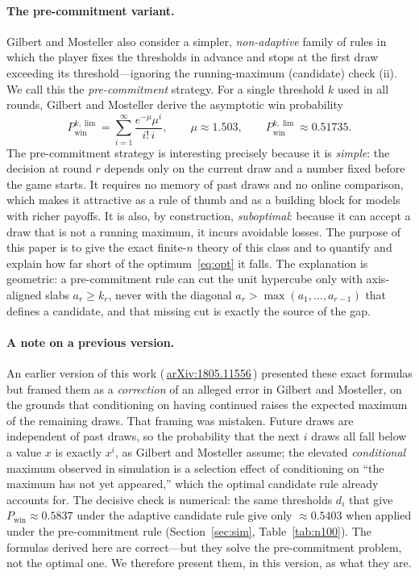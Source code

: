 \documentclass[11pt]{article}
\newcommand{\amax}{\operatorname{max}}
\begin{document}
\paragraph{The pre-commitment variant.}
Gilbert and Mosteller also consider a simpler, \emph{non-adaptive} family of rules in
which the player fixes the thresholds in advance and stops at the first draw exceeding
its threshold---ignoring the running-maximum (candidate) check (ii). We call this the
\emph{pre-commitment} strategy. For a single threshold $k$ used in all rounds, Gilbert
and Mosteller derive the asymptotic win probability
\begin{equation}\label{eq:pcsingle}
  P_{\text{win}}^{k,\lim}=\sum_{i=1}^{\infty}\frac{e^{-\mu}\mu^{i}}{i!\,i},
  \qquad \mu\approx 1.503,\qquad P_{\text{win}}^{k,\lim}\approx 0.51735 .
\end{equation}
The pre-commitment strategy is interesting precisely because it is \emph{simple}: the
decision at round $r$ depends only on the current draw and a number fixed before the
game starts. It requires no memory of past draws and no online comparison, which makes
it attractive as a rule of thumb and as a building block for models with richer
payoffs. It is also, by construction, \emph{suboptimal}: because it can accept a draw
that is not a running maximum, it incurs avoidable losses. The purpose of this paper is
to give the exact finite-$n$ theory of this class and to quantify and explain how far
short of the optimum~\eqref{eq:opt} it falls. The explanation is geometric: a
pre-commitment rule can cut the unit hypercube only with axis-aligned slabs $a_r\ge k_r$,
never with the diagonal $a_r>\amax(a_1,\dots,a_{r-1})$ that defines a candidate, and that
missing cut is exactly the source of the gap.

\paragraph{A note on a previous version.} An earlier version of this work
(\,\href{https://arxiv.org/abs/1805.11556}{arXiv:1805.11556}\,) presented these exact
formulas but framed them as a \emph{correction} of an alleged error in Gilbert and
Mosteller, on the grounds that conditioning on having continued raises the expected
maximum of the remaining draws. That framing was mistaken. Future draws are
independent of past draws, so the probability that the next $i$ draws all fall below a
value $x$ is exactly $x^{i}$, as Gilbert and Mosteller assume; the elevated
\emph{conditional} maximum observed in simulation is a selection effect of conditioning
on ``the maximum has not yet appeared,'' which the optimal candidate rule already
accounts for. The decisive check is numerical: the same thresholds $d_i$
that give $P_{\text{win}}\approx 0.5837$ under the adaptive candidate rule give only
$\approx 0.5403$ when applied under the pre-commitment rule (Section~\ref{sec:sim},
Table~\ref{tab:n100}). The formulas derived here are correct---but they solve the
pre-commitment problem, not the optimal one. We therefore present them, in this
version, as what they are.
\end{document}
